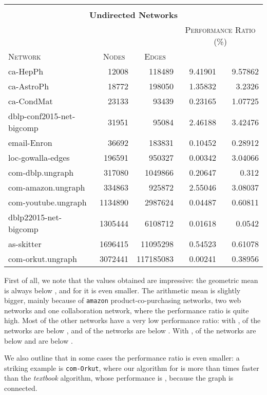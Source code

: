 \documentclass{acm_proc_article-sp}
\begin{document}
\begin{table*}[t]
\begin{scriptsize}
\begin{tabular}{|l|r|r|r|r|}
 \multicolumn{5}{c}{} \\
\multicolumn{5}{c}{\textbf{Undirected Networks}} \\
\hline
 &  &  & \multicolumn{2}{c|}{\textsc{Performance Ratio (\%)}} \\
\textsc{Network} & \multicolumn{1}{c|}{\textsc{Nodes}} & \multicolumn{1}{c|}{\textsc{Edges}} & \multicolumn{1}{c|}{} & \multicolumn{1}{c|}{} \\
\hline
ca-HepPh & 12008 & 118489 & 9.41901 & 9.57862\\
ca-AstroPh & 18772 & 198050 & 1.35832 & 3.2326\\
ca-CondMat & 23133 & 93439 & 0.23165 & 1.07725\\
dblp-conf2015-net-bigcomp & 31951 & 95084 & 2.46188 & 3.42476\\
email-Enron & 36692 & 183831 & 0.10452 & 0.28912\\
loc-gowalla-edges & 196591 & 950327 & 0.00342 & 3.04066\\
com-dblp.ungraph & 317080 & 1049866 & 0.20647 & 0.312\\
com-amazon.ungraph & 334863 & 925872 & 2.55046 & 3.08037\\
com-youtube.ungraph & 1134890 & 2987624 & 0.04487 & 0.60811\\
dblp22015-net-bigcomp & 1305444 & 6108712 & 0.01618 & 0.0542\\
as-skitter & 1696415 & 11095298 & 0.54523 & 0.61078\\
com-orkut.ungraph & 3072441 & 117185083 & 0.00241 & 0.38956 \\
\hline
\end{tabular}
\end{scriptsize}
\end{table*}


First of all, we note that the values obtained are impressive: the geometric mean is always below , and for  it is even smaller. The arithmetic mean is slightly bigger, mainly because of \texttt{amazon} product-co-purchasing networks, two web networks and one collaboration network, where the performance ratio is quite high. 
Most of the other networks have a very low performance ratio: with ,  of the networks are below , and  of the networks are below . With ,  of the networks are below  and  are below .

We also outline that in some cases the performance ratio is even smaller: a striking example is \texttt{com-Orkut}, where our algorithm for  is more than  times faster than the \emph{textbook} algorithm, whose performance is , because the graph is connected.
\end{document}

